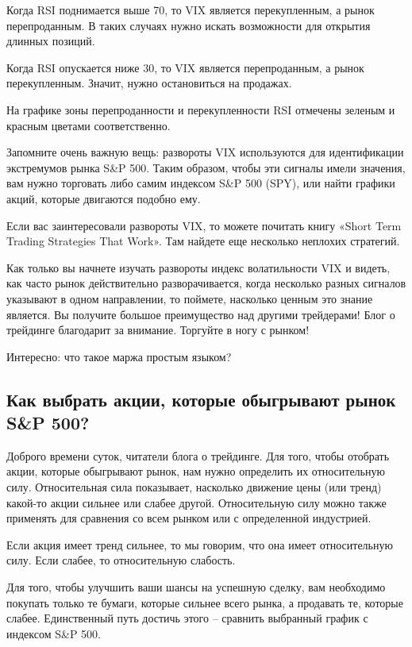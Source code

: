\documentclass{book}
\begin{document}
Когда RSI поднимается выше 70, то VIX является перекупленным, а рынок перепроданным. В таких случаях нужно искать возможности для открытия длинных позиций.

Когда RSI опускается ниже 30, то VIX является перепроданным, а рынок перекупленным. Значит, нужно остановиться на продажах.

На графике зоны перепроданности и перекупленности RSI отмечены зеленым и красным цветами соответственно.

Запомните очень важную вещь: развороты VIX используются для идентификации экстремумов рынка S\&P 500. Таким образом, чтобы эти сигналы имели значения, вам нужно торговать либо самим индексом S\&P 500 (SPY), или найти графики акций, которые двигаются подобно ему.

Если вас заинтересовали развороты VIX, то можете почитать книгу «Short Term Trading Strategies That Work». Там найдете еще несколько неплохих стратегий.

Как только вы начнете изучать развороты индекс волатильности VIX и видеть, как часто рынок действительно разворачивается, когда несколько разных сигналов указывают в одном направлении, то поймете, насколько ценным это знание является. Вы получите большое преимущество над другими трейдерами! Блог о трейдинге благодарит за внимание. Торгуйте в ногу с рынком!


Интересно: что такое маржа простым языком?

\subsection{Как выбрать акции, которые обыгрывают рынок S\&P 500?}

Доброго времени суток, читатели блога о трейдинге. Для того, чтобы отобрать акции, которые обыгрывают рынок, нам нужно определить их относительную силу. Относительная сила показывает, насколько движение цены (или тренд) какой-то акции сильнее или слабее другой. Относительную силу можно также применять для сравнения со всем рынком или с определенной индустрией.

Если акция имеет тренд сильнее, то мы говорим, что она имеет относительную силу. Если слабее, то относительную слабость.

Для того, чтобы улучшить ваши шансы на успешную сделку, вам необходимо покупать только те бумаги, которые сильнее всего рынка, а продавать те, которые слабее. Единственный путь достичь этого – сравнить выбранный график с индексом S\&P 500.
\end{document}

